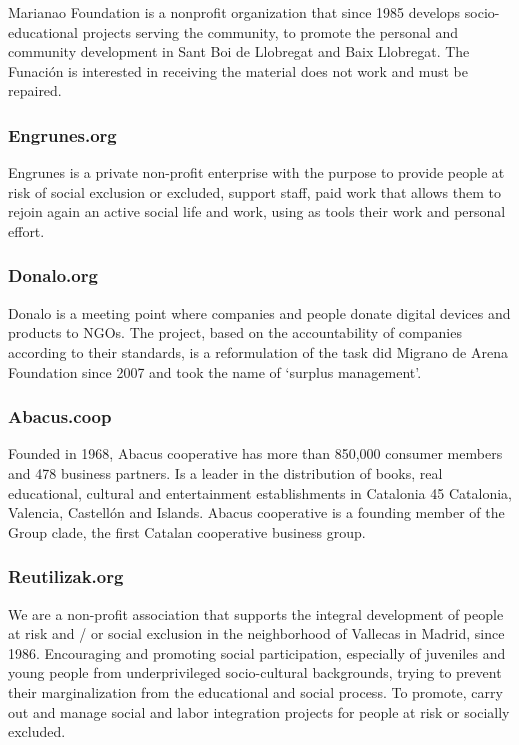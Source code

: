 \documentclass[
]{book}
\begin{document}
Marianao Foundation is a nonprofit organization that since 1985 develops socio-educational projects serving the community, to promote the personal and community development in Sant Boi de Llobregat and Baix Llobregat. The Funación is interested in receiving the material does not work and must be repaired.

\hypertarget{engrunes.org}{%
\subsubsection{Engrunes.org}\label{engrunes.org}}

Engrunes is a private non-profit enterprise with the purpose to provide people at risk of social exclusion or excluded, support staff, paid work that allows them to rejoin again an active social life and work, using as tools their work and personal effort.

\hypertarget{donalo.org}{%
\subsubsection{Donalo.org}\label{donalo.org}}

Donalo is a meeting point where companies and people donate digital devices and products to NGOs. The project, based on the accountability of companies according to their standards, is a reformulation of the task did Migrano de Arena Foundation since 2007 and took the name of `surplus management'.

\hypertarget{abacus.coop}{%
\subsubsection{Abacus.coop}\label{abacus.coop}}

Founded in 1968, Abacus cooperative has more than 850,000 consumer members and 478 business partners. Is a leader in the distribution of books, real educational, cultural and entertainment establishments in Catalonia 45 Catalonia, Valencia, Castellón and Islands. Abacus cooperative is a founding member of the Group clade, the first Catalan cooperative business group.

\hypertarget{reutilizak.org}{%
\subsubsection{Reutilizak.org}\label{reutilizak.org}}

We are a non-profit association that supports the integral development of people at risk and / or social exclusion in the neighborhood of Vallecas in Madrid, since 1986. Encouraging and promoting social participation, especially of juveniles and young people from underprivileged socio-cultural backgrounds, trying to prevent their marginalization from the educational and social process. To promote, carry out and manage social and labor integration projects for people at risk or socially excluded.
\end{document}
